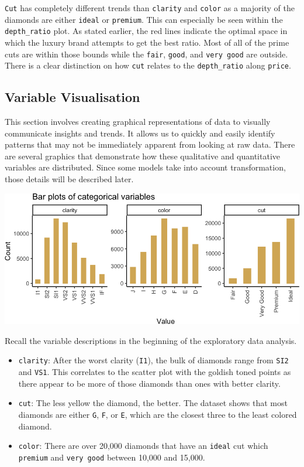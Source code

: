 \documentclass[
  paper=a4,
  ,captions=tableheading
]{scrartcl}
\begin{document}
\texttt{Cut} has completely different trends than \texttt{clarity} and
\texttt{color} as a majority of the diamonds are either \texttt{ideal}
or \texttt{premium}. This can especially be seen within the
\texttt{depth\_ratio} plot. As stated earlier, the red lines indicate
the optimal space in which the luxury brand attempts to get the best
ratio. Most of all of the prime cuts are within those bounds while the
\texttt{fair}, \texttt{good}, and \texttt{very\ good} are outside. There
is a clear distinction on how \texttt{cut} relates to the
\texttt{depth\_ratio} along \texttt{price}.

\hypertarget{variable-visualisation}{%
\subsection{Variable Visualisation}\label{variable-visualisation}}

This section involves creating graphical representations of data to
visually communicate insights and trends. It allows us to quickly and
easily identify patterns that may not be immediately apparent from
looking at raw data. There are several graphics that demonstrate how
these qualitative and quantitative variables are distributed. Since some
models take into account transformation, those details will be described
later.

\begin{center}\includegraphics{Diamonds_PDF_files/figure-latex/categorical bar plots-1} \end{center}

Recall the variable descriptions in the beginning of the exploratory
data analysis.

\begin{itemize}
\item
  \texttt{clarity}: After the worst clarity (\texttt{I1}), the bulk of
  diamonds range from \texttt{SI2} and \texttt{VS1}. This correlates to
  the scatter plot with the goldish toned points as there appear to be
  more of those diamonds than ones with better clarity.
\item
  \texttt{cut}: The less yellow the diamond, the better. The dataset
  shows that most diamonds are either \texttt{G}, \texttt{F}, or
  \texttt{E}, which are the closest three to the least colored diamond.
\item
  \texttt{color}: There are over 20,000 diamonds that have an
  \texttt{ideal} cut which \texttt{premium} and \texttt{very\ good}
  between 10,000 and 15,000.
\end{itemize}
\end{document}
